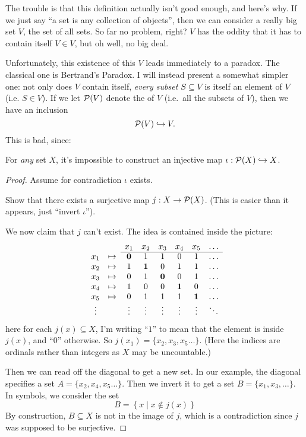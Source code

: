 The trouble is that this definition actually isn't good enough, and here's why.
If we just say ``a set is any collection of objects'',
then we can consider a really big set $V$, the set of all sets.
So far no problem, right?
$V$ has the oddity that it has to contain itself $V \in V$,
but oh well, no big deal.

Unfortunately, this existence of this $V$ leads immediately to a paradox.
The classical one is Bertrand's Paradox.
I will instead present a somewhat simpler one:
not only does $V$ contain itself, \emph{every subset $S \subseteq V$}
is itself an element of $V$ (i.e. $S \in V$).
If we let $\mathcal P(V)$ denote the  of $V$
(i.e.\ all the subsets of $V$), then we have an inclusion
\[ \mathcal P(V) \hookrightarrow V. \]
This is bad, since:
\begin{lemma}
	\label{lem:cantor_diag}
	For \emph{any} set $X$, it's impossible to construct an injective
	map $\iota : \mathcal P(X) \hookrightarrow X$.
\end{lemma}
\begin{proof}
	Assume for contradiction $\iota$ exists.
	\begin{exercise}
		Show that there exists a surjective map $j : X \to \mathcal P(X)$.
		(This is easier than it appears, just ``invert $\iota$'').
	\end{exercise}
	We now claim that $j$ can't exist.
	The idea is contained inside the picture:
	\[
		\begin{array}{cccccccc}
			&& x_1 & x_2 & x_3 & x_4 & x_5 & \dots \\ \cline{3-8}
			x_1 & \mapsto & \mathbf0 & 1 & 1 & 0 & 1 & \dots \\
			x_2 & \mapsto & 1 & \mathbf1 & 0 & 1 & 1 & \dots \\
			x_3 & \mapsto & 0 & 1 & \mathbf0 & 0 & 1 & \dots \\
			x_4 & \mapsto & 1 & 0 & 0 & \mathbf1 & 0 & \dots \\
			x_5 & \mapsto & 0 & 1 & 1 & 1 & \mathbf1 & \dots \\
			\vdots && \vdots & \vdots & \vdots & \vdots & \vdots & \ddots
		\end{array}
	\]
	here for each $j(x) \subseteq X$, I'm writing ``$1$'' to mean that
	the element is inside $j(x)$, and ``$0$'' otherwise.
	So $j(x_1) = \{x_2, x_3, x_5 \dots\}$.
	(Here the indices are ordinals rather than integers
	as $X$ may be uncountable.)

	Then we can read off the diagonal to get a new set.
	In our example, the diagonal specifies a set
	$A = \{x_2, x_4, x_5 \dots\}$.
	Then we invert it to get a set $B = \{x_1, x_3, \dots\}$.
	In symbols, we consider the set
	\[ B = \left\{ x \mid x \notin j(x) \right\} \]
	By construction, $B \subseteq X$ is not in the image of $j$,
	which is a contradiction since $j$ was supposed to be surjective.
\end{proof}


